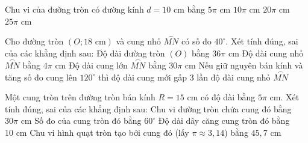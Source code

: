 \begin{ex}%
	Chu vi của đường tròn có đường kính $d = 10\text{ cm}$ bằng
	\choice
	{$5\pi\text{ cm}$}
	{\True $10\pi\text{ cm}$}
	{$20\pi\text{ cm}$}
	{$25\pi\text{ cm}$}
\end{ex}

\begin{ex}%
	Cho đường tròn $(O; 18\text{ cm})$ và cung nhỏ $\overset{\frown}{MN}$ có số đo $40^\circ$. Xét tính đúng, sai của các khẳng định sau:
	\choiceTF
	{\True Độ dài đường tròn $(O)$ bằng $36\pi\text{ cm}$}
	{\True Độ dài cung nhỏ $\overset{\frown}{MN}$ bằng $4\pi\text{ cm}$}
	{Độ dài cung lớn $\overset{\frown}{MN}$ bằng $30\pi\text{ cm}$}
	{\True Nếu giữ nguyên bán kính và tăng số đo cung lên $120^\circ$ thì độ dài cung mới gấp $3$ lần độ dài cung nhỏ $\overset{\frown}{MN}$}
\end{ex}

\begin{ex}%
	Một cung tròn trên đường tròn bán kính $R = 15\text{ cm}$ có độ dài bằng $5\pi\text{ cm}$. Xét tính đúng, sai của các khẳng định sau:
	\choiceTF
	{\True Chu vi đường tròn chứa cung đó bằng $30\pi\text{ cm}$}
	{\True Số đo của cung tròn đó bằng $60^\circ$}
	{Độ dài dây căng cung tròn đó bằng $10\text{ cm}$}
	{\True Chu vi hình quạt tròn tạo bởi cung đó (lấy $\pi \approx 3{,}14$) bằng $45{,}7\text{ cm}$}
\end{ex}

